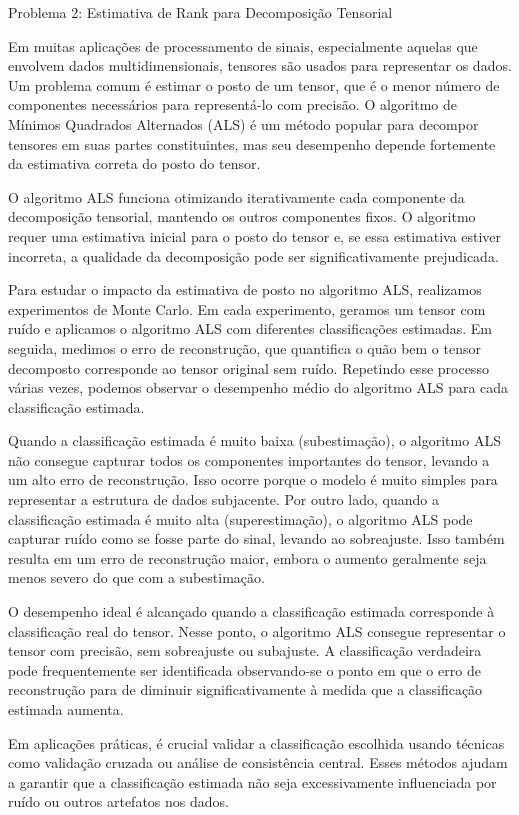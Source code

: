 	Problema 2: Estimativa de Rank para Decomposição Tensorial
	
	Em muitas aplicações de processamento de sinais, especialmente aquelas que envolvem dados multidimensionais, tensores são usados para representar os dados. Um problema comum é estimar o posto de um tensor, que é o menor número de componentes necessários para representá-lo com precisão. O algoritmo de Mínimos Quadrados Alternados (ALS) é um método popular para decompor tensores em suas partes constituintes, mas seu desempenho depende fortemente da estimativa correta do posto do tensor.
	
	O algoritmo ALS funciona otimizando iterativamente cada componente da decomposição tensorial, mantendo os outros componentes fixos. O algoritmo requer uma estimativa inicial para o posto do tensor e, se essa estimativa estiver incorreta, a qualidade da decomposição pode ser significativamente prejudicada.
	
	Para estudar o impacto da estimativa de posto no algoritmo ALS, realizamos experimentos de Monte Carlo. Em cada experimento, geramos um tensor com ruído e aplicamos o algoritmo ALS com diferentes classificações estimadas. Em seguida, medimos o erro de reconstrução, que quantifica o quão bem o tensor decomposto corresponde ao tensor original sem ruído. Repetindo esse processo várias vezes, podemos observar o desempenho médio do algoritmo ALS para cada classificação estimada.
	
	Quando a classificação estimada é muito baixa (subestimação), o algoritmo ALS não consegue capturar todos os componentes importantes do tensor, levando a um alto erro de reconstrução. Isso ocorre porque o modelo é muito simples para representar a estrutura de dados subjacente. Por outro lado, quando a classificação estimada é muito alta (superestimação), o algoritmo ALS pode capturar ruído como se fosse parte do sinal, levando ao sobreajuste. Isso também resulta em um erro de reconstrução maior, embora o aumento geralmente seja menos severo do que com a subestimação.
	
	O desempenho ideal é alcançado quando a classificação estimada corresponde à classificação real do tensor. Nesse ponto, o algoritmo ALS consegue representar o tensor com precisão, sem sobreajuste ou subajuste. A classificação verdadeira pode frequentemente ser identificada observando-se o ponto em que o erro de reconstrução para de diminuir significativamente à medida que a classificação estimada aumenta.
	
	Em aplicações práticas, é crucial validar a classificação escolhida usando técnicas como validação cruzada ou análise de consistência central. Esses métodos ajudam a garantir que a classificação estimada não seja excessivamente influenciada por ruído ou outros artefatos nos dados.
	

